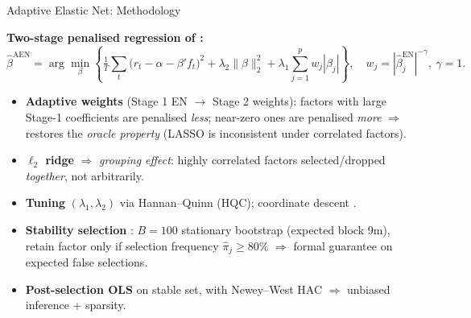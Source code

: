 \documentclass[aspectratio=169,11pt]{beamer}
\newcommand{\hlt}[1]{\textcolor{edhecred}{\textbf{#1}}}     %
\begin{document}
\begin{frame}[t]{Adaptive Elastic Net: Methodology}
\small

\textbf{Two-stage penalised regression of \citet{zou2009adaptive}:}
\vspace{-0.10cm}
\[
  \hat{\beta}^{\text{AEN}}
  = \arg\min_\beta
  \left\{
    \tfrac{1}{T}\sum_t \bigl(r_t - \alpha - \beta'f_t\bigr)^2
    + \lambda_2 \|\beta\|_2^2
    + \lambda_1 \sum_{j=1}^{p} w_j |\beta_j|
  \right\},
  \quad w_j = |\hat{\beta}_j^{\text{EN}}|^{-\gamma}, \ \gamma=1.
\]

\vspace{0.20cm}

\begin{itemize}\itemsep=0.18cm\footnotesize
  \item \hlt{Adaptive weights} (Stage 1 EN $\to$ Stage 2 weights): factors with large
        Stage-1 coefficients are penalised \emph{less}; near-zero ones are penalised \emph{more}
        $\Rightarrow$ restores the \emph{oracle property} (LASSO is inconsistent under correlated factors).
  \item \hlt{$\ell_2$ ridge} $\Rightarrow$ \emph{grouping effect}: highly correlated factors
        selected/dropped \emph{together}, not arbitrarily.
  \item \hlt{Tuning} $(\lambda_1,\lambda_2)$ via Hannan--Quinn (HQC); coordinate descent
        \citep{friedman2010regularization}.
  \item \hlt{Stability selection} \citep{meinshausen2010stability}: $B = 100$ stationary
        bootstrap (expected block 9m), retain factor only if selection frequency
        $\hat\pi_j \geq 80\%$ $\Rightarrow$ formal guarantee on expected false selections.
  \item \hlt{Post-selection OLS} on stable set, with Newey--West HAC
        $\Rightarrow$ unbiased inference + sparsity.
\end{itemize}

\end{frame}
\end{document}
